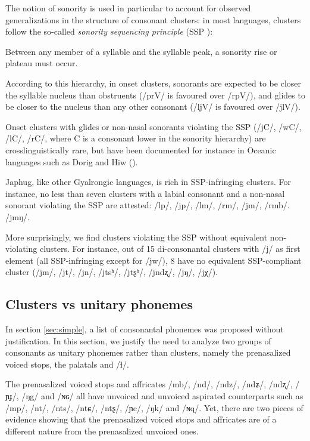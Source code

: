 \documentclass[oneside,a4paper,11pt]{article}
\newcommand{\ipa}[1]{\mbox{\phon/#1/}}
\renewcommand{\footnote}[1]{\endnote{\normalsize#1}}
\begin{document}
The notion of sonority is used in particular to account for observed generalizations in the structure of consonant clusters: in most languages, clusters follow the so-called \textit{sonority sequencing principle} (SSP \citealt[210]{blevins95syllable}):

\begin{exe}
\ex \label{ex:ssp}
\glt Between any member of a syllable and the syllable peak, a sonority
rise or plateau must occur.
\end{exe}

According to this hierarchy, in onset clusters, sonorants are expected to be closer the syllable nucleus than obstruents (\ipa{prV} is favoured over \ipa{rpV}), and glides to be closer to the nucleus than any other consonant (\ipa{ljV} is favoured over \ipa{jlV}).

Onset clusters with glides or non-nasal sonorants violating the SSP (\ipa{jC}, \ipa{wC}, \ipa{lC}, \ipa{rC}, where C is a consonant lower in the sonority hierarchy) are crosslinguistically rare, but have been documented for instance in Oceanic languages such as Dorig and Hiw (\citealt[405-412]{francois10gl}). 

Japhug, like other Gyalrongic languages,\footnote{See for instance \citet{jackson00puxi} and \citet[25-29]{lai13affixale}).} is rich in SSP-infringing  clusters. For instance, no less than seven clusters with a labial consonant and a non-nasal sonorant violating the SSP are attested:  \ipa{lp}, \ipa{jp}, \ipa{lm}, \ipa{rm}, \ipa{jm}, \ipa{rmb}. \ipa{jmŋ}. 

More surprisingly, we find clusters violating the SSP without equivalent non-violating clusters. For instance, out of 15 di-consonantal clusters with \ipa{j} as first element (all SSP-infringing  except for \ipa{jw}), 8 have no equivalent SSP-compliant  cluster (\ipa{jm}, \ipa{jt}, \ipa{jn}, \ipa{jtsʰ}, \ipa{jtʂʰ}, \ipa{jndʐ}, \ipa{jŋ}, \ipa{jχ}).

\subsection*{Clusters vs unitary phonemes} \label{sec:non.clusters}
 In section \ref{sec:simple}, a list of consonantal phonemes was proposed without justification. In this section, we justify the need to analyze two groups of consonants as unitary phonemes rather than clusters, namely the prenasalized voiced stops, the palatals and \ipa{ɬ}.
 

The prenasalized voiced stops and affricates \ipa{mb}, \ipa{nd}, \ipa{ndz}, \ipa{ndʑ}, \ipa{ndʐ}, \ipa{ɲɟ}, \ipa{ŋg} and \ipa{ɴɢ} all have unvoiced and unvoiced aspirated counterparts such as \ipa{mp}, \ipa{nt}, \ipa{nts}, \ipa{ntɕ}, \ipa{ntʂ}, \ipa{ɲc}, \ipa{ŋk} and \ipa{ɴq}. Yet, there are two pieces of evidence showing that the prenasalized voiced stops and affricates are of a different nature from the prenasalized unvoiced ones. 
\end{document}
